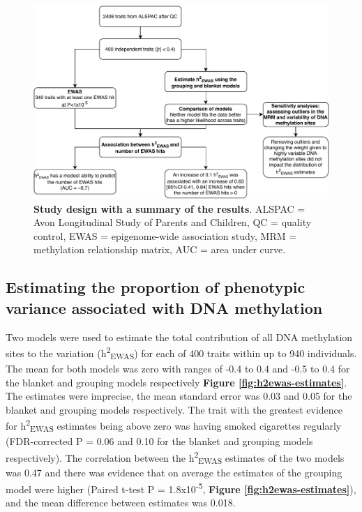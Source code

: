 \documentclass[11pt,oneside]{bristolthesis}
\begin{document}
\begin{figure}

{\centering \includegraphics[width=1\linewidth]{figure/05-h2ewas/m2_workflow} 

}

\caption[Study design with a summary of the results]{\textbf{Study design with a summary of the results}. ALSPAC = Avon Longitudinal Study of Parents and Children, QC = quality control, EWAS = epigenome-wide association study, MRM = methylation relationship matrix, AUC = area under curve.}\label{fig:h2ewas-study-design}
\end{figure}
\hypertarget{estimating-h2ewas}{%
\subsection{Estimating the proportion of phenotypic variance associated with DNA methylation}\label{estimating-h2ewas}}

Two models were used to estimate the total contribution of all DNA methylation sites to the variation (h\textsuperscript{2}\textsubscript{EWAS}) for each of 400 traits within up to 940 individuals. The mean for both models was zero with ranges of -0.4 to 0.4 and -0.5 to 0.4 for the blanket and grouping models respectively \textbf{Figure \ref{fig:h2ewas-estimates}}. The estimates were imprecise, the mean standard error was 0.03 and 0.05 for the blanket and grouping models respectively. The trait with the greatest evidence for h\textsuperscript{2}\textsubscript{EWAS} estimates being above zero was having smoked cigarettes regularly (FDR-corrected P = 0.06 and 0.10 for the blanket and grouping models respectively). The correlation between the h\textsuperscript{2}\textsubscript{EWAS} estimates of the two models was 0.47 and there was evidence that on average the estimates of the grouping model were higher (Paired t-test P = 1.8x10\textsuperscript{-5}, \textbf{Figure \ref{fig:h2ewas-estimates}}), and the mean difference between estimates was 0.018.
\end{document}
